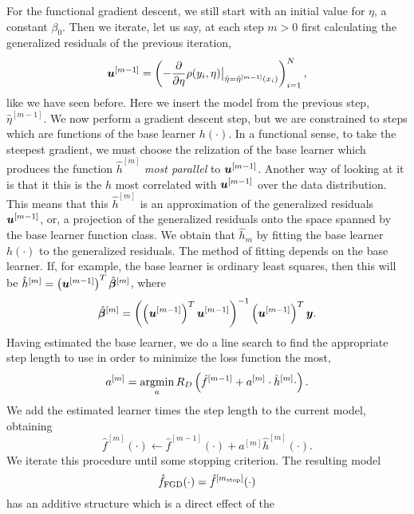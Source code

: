 For the functional gradient descent, we still start with an initial value for $\eta$, a constant $\beta_0$.
Then we iterate, let us say, at each step $m>0$ first calculating the generalized residuals of the previous iteration,
\begin{equation}
    \bm{u}^{[m-1]}=\left(-\frac{\partial}{\partial \eta}\rho(y_i, \eta)\big\rvert_{\hat{\eta}=\hat{\eta}^{[m-1]}(x_i)}\right)_{i=1}^N,
\end{equation}
like we have seen before. Here we insert the model from the previous step, $\hat{\eta}^{[m-1]}$.
We now perform a gradient descent step, but we are constrained to steps which are functions of the base learner $h(\cdot)$.
In a functional sense, to take the steepest gradient, we must choose the relization of the base learner which produces the
function $\hat{h}^{[m]}$ \textit{most parallel} to $\bm{u}^{[m-1]}$. Another way of looking at it is that it this is the $h$ most 
correlated with $\bm{u}^{[m-1]}$ over the data distribution.
This means that this $\hat{h}^{[m]}$ is an approximation of the generalized residuals $\bm{u}^{[m-1]}$, or, a projection of the generalized residuals onto the space spanned by the base learner function class.
We obtain that $\hat{h}_m$ by fitting the base learner $h(\cdot)$ to the generalized residuals.
The method of fitting depends on the base learner. If, for example, the base learner is ordinary least squares, then this will be $\hat{h}^{[m]}=\left(\bm{u}^{[m-1]}\right)^T\hat{\boldsymbol{\beta}}^{[m]}$, where
\begin{equation}
    \hat{\boldsymbol{\beta}}^{[m]}=\left(\left(\bm{u}^{[m-1]}\right)^T\bm{u}^{[m-1]}\right)^{-1}\left(\bm{u}^{[m-1]}\right)^T\bm{y}.
\end{equation}
Having estimated the base learner, we do a line search to find the appropriate step length to use in order to minimize the loss function the most,
\begin{equation}
    a^{[m]}=\operatorname*{argmin}_{a}R_D\left(\hat{f}^{[m-1]}+a^{[m]}\cdot\hat{h}^{[m]}{\cdot}\right).
\end{equation}
We add the estimated learner times the step length to the current model, obtaining
\begin{equation}
    \hat{f}^{[m]}(\cdot)\gets \hat{f}^{[m-1]}(\cdot)+a^{[m]}\hat{h}^{[m]}(\cdot).
\end{equation}
We iterate this procedure until some stopping criterion. The resulting model
\begin{equation}
    \hat{f}_{\text{FGD}}(\cdot)=\hat{f}^{[m_{\text{stop}}]}(\cdot)
\end{equation}
has an additive structure which is a direct effect of the
